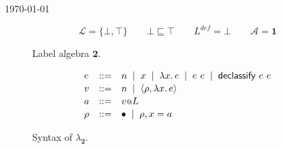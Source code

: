 \documentclass{article}
\makeatletter
\newcommand{\at}{\ensuremath{{\scriptstyle{@}}}}
\theoremstyle{definition}
\makeatother
\begin{document}
\begin{flushright}
  \today
\end{flushright}

\begin{figure}[ht]
  \centering
  \[
  \mathcal{L} = \{ \bot, \top \}
  \qquad
  \bot \sqsubseteq \top
  \qquad
  L^{\mathit{def}} = \bot
  \qquad
  \mathcal{A} = \mathbf{1}
  \]
  \caption{Label algebra $\mathbf{2}$.}
  \label{fig:two}
\end{figure}

\begin{figure}[ht]
  \centering
  \[
  \begin{array}[t]{lcl}
    e & ::= &
    n\;\; |\;\;
    x\;\; |\;\;
    \lambda{x}.\, e\;\; |\;\;
    e\ e\;\; |\;\;
    \mathsf{declassify}\ e\ e
    \\[0.3ex]
    v & ::= &
    n\;\; |\;\;
    \langle{\rho, \lambda{x}.\, e\rangle}
    \\[0.3ex]
    a & ::= &
    v \at L
    \\[0.3ex]
    \rho & ::= &
    \bullet\;\; |\;\;
    \rho, x = a
  \end{array}
  \]
  \caption{Syntax of $\lambda_{\mathbf{2}}$.}
  \label{fig:syntax}
\end{figure}
\end{document}
